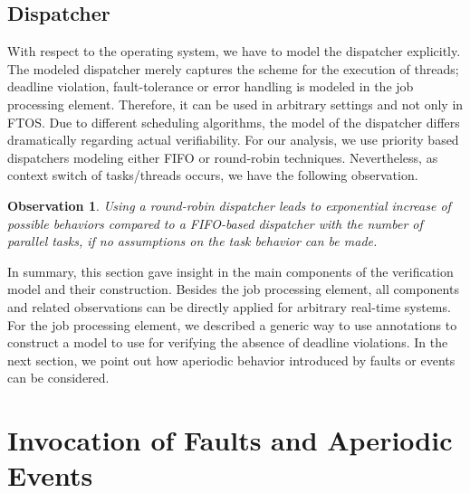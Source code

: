 \documentclass[10pt, a4paper, onecolumn, conference, compsocconf]{IEEEtran}
\newtheorem{obser}{Observation}
\begin{document}
\subsection{Dispatcher\label{sec.Dispatcher}}
With respect to the operating system, we have to model the dispatcher explicitly.
The modeled dispatcher merely captures the scheme for the execution of threads; deadline violation, fault-tolerance or error handling is modeled in the job processing element. Therefore, it can be used in arbitrary settings and not only in FTOS.
Due to different scheduling algorithms, the model of the dispatcher differs dramatically regarding actual verifiability.
For our analysis, we use priority based dispatchers modeling either FIFO or round-robin techniques.
Nevertheless, as context switch of tasks/threads occurs, we have the following observation.

\begin{obser}
Using a round-robin dispatcher leads to exponential increase of possible behaviors compared to a FIFO-based dispatcher with the number of parallel tasks, if no assumptions on the task behavior can be made.
\end{obser}

In summary, this section gave insight in the main components of the verification model and their construction. Besides the job processing element, all components and related observations can be directly applied for arbitrary real-time systems. For the job processing element, we described a generic way to use annotations to construct a model to use for verifying the absence of deadline violations. In the next section, we point out how aperiodic behavior introduced by faults or events can be considered.
\section{Invocation of Faults and Aperiodic Events\label{Sec.Invocation.Faults.Events}}
\end{document}
